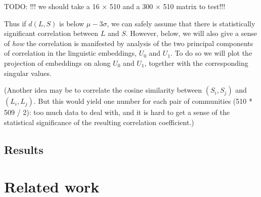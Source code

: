 \documentclass[11pt]{article}
\newcommand\bn[1]{\todo[backgroundcolor=green!10]{BN: #1}}
\begin{document}
TODO: !!! we should take a 16 × 510 and a 300 × 510 matrix to test!!!


Thus if \(d(L,S)\) is below \(μ-3σ\), we can safely assume that there \bn{above  \(μ+3σ\) (\num{79.50})?}
is statistically significant correlation between \(L\) and
\(S\). However, below, we will also give a sense of \emph{how} the
correlation is manifested by analysis of the two principal components
of correlation in the linguistic embeddings, \(U_0\) and \(U_1\). To
do so we will plot the projection of embeddings on along \(U_0\) and
\(U_1\), together with the corresponding singular values.


(Another idea may be to correlate the cosine similarity between
\((S_i,S_j)\) and \((L_i,L_j)\). But this would yield one number for
each pair of communities (510 * 509 / 2): too much data to deal with,
and it is hard to get a sense of the statistical significance of the
resulting correlation coefficient.)




\subsection{Results}







\section{Related work}
\end{document}
